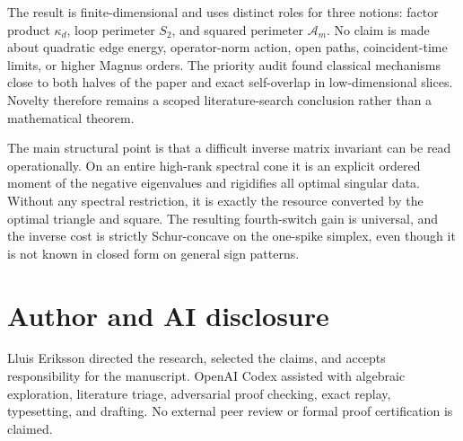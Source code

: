 \documentclass[11pt]{article}
\theoremstyle{definition}
\theoremstyle{remark}
\newcommand{\1}{\mathbf 1}
\begin{document}
The result is finite-dimensional and uses distinct roles for three notions:
factor product $\kappa_d$, loop perimeter $S_2$, and squared perimeter
$\mathcal A_m$.  No claim is made about quadratic edge energy, operator-norm
action, open paths, coincident-time limits, or higher Magnus orders.  The
priority audit found classical mechanisms close to both halves of the paper
and exact self-overlap in low-dimensional slices.  Novelty therefore remains
a scoped literature-search conclusion rather than a mathematical theorem.

The main structural point is that a difficult inverse matrix invariant can be
read operationally.  On an entire high-rank spectral cone it is an explicit
ordered moment of the negative eigenvalues and rigidifies all optimal
singular data.  Without any spectral restriction, it is exactly the resource
converted by the optimal triangle and square.  The resulting fourth-switch
gain is universal, and the inverse cost is strictly Schur-concave on the
one-spike simplex, even though it is not known in closed form on general sign
patterns.

\section*{Author and AI disclosure}

Lluis Eriksson directed the research, selected the claims, and accepts
responsibility for the manuscript.  OpenAI Codex assisted with algebraic
exploration, literature triage, adversarial proof checking, exact replay,
typesetting, and drafting.  No external peer review or formal proof
certification is claimed.

\small


\end{document}
